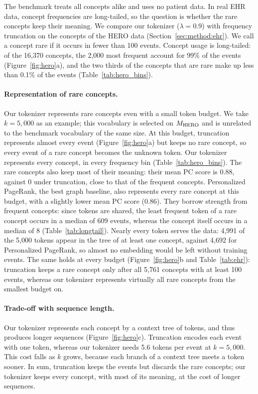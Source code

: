 The benchmark treats all concepts alike and uses no patient data.
In real EHR data, concept frequencies are long-tailed, so the question is whether the rare concepts keep their meaning.
We compare our tokenizer ($\lambda = 0.9$) with frequency truncation on the concepts of the HERO data (Section~\ref{sec:method:ehr}).
We call a concept rare if it occurs in fewer than 100 events.
Concept usage is long-tailed: of the 16,370 concepts, the 2,000 most frequent account for 99\% of the events (Figure~\ref{fig:hero}a), and the two thirds of the concepts that are rare make up less than 0.1\% of the events (Table~\ref{tab:hero_bins}).

\paragraph{Representation of rare concepts.}
Our tokenizer represents rare concepts even with a small token budget.
We take $k = 5{,}000$ as an example; this vocabulary is selected on $M_{\mathrm{HERO}}$ and is unrelated to the benchmark vocabulary of the same size.
At this budget, truncation represents almost every event (Figure~\ref{fig:hero}a) but keeps no rare concept, so every event of a rare concept becomes the unknown token.
Our tokenizer represents every concept, in every frequency bin (Table~\ref{tab:hero_bins}).
The rare concepts also keep most of their meaning: their mean PC score is 0.88, against 0 under truncation, close to that of the frequent concepts.
Personalized PageRank, the best graph baseline, also represents every rare concept at this budget, with a slightly lower mean PC score (0.86).
They borrow strength from frequent concepts: since tokens are shared, the least frequent token of a rare concept occurs in a median of 609 events, whereas the concept itself occurs in a median of 8 (Table~\ref{tab:longtail}).
Nearly every token serves the data: 4,991 of the 5,000 tokens appear in the tree of at least one concept, against 4,692 for Personalized PageRank, so almost no embedding would be left without training events.
The same holds at every budget (Figure~\ref{fig:hero}b and Table~\ref{tab:ehr}): truncation keeps a rare concept only after all 5,761 concepts with at least 100 events, whereas our tokenizer represents virtually all rare concepts from the smallest budget on.

\paragraph{Trade-off with sequence length.}
Our tokenizer represents each concept by a context tree of tokens, and thus produces longer sequences (Figure~\ref{fig:hero}c).
Truncation encodes each event with one token, whereas our tokenizer needs 5.6 tokens per event at $k = 5{,}000$.
This cost falls as $k$ grows, because each branch of a context tree meets a token sooner.
In sum, truncation keeps the events but discards the rare concepts; our tokenizer keeps every concept, with most of its meaning, at the cost of longer sequences.

